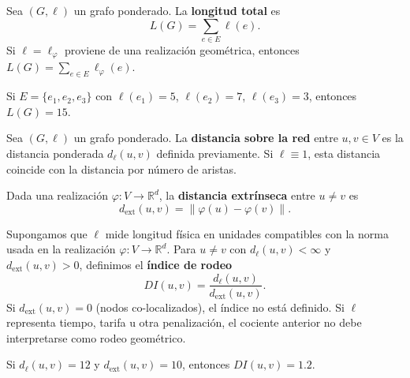         \begin{definicion}
            Sea $(G,\ell)$ un grafo ponderado. La \textbf{longitud total} es
            \[
            L(G)=\sum_{e\in E}\ell(e).
            \]
            Si $\ell=\ell_\varphi$ proviene de una realización geométrica, entonces $L(G)=\sum_{e\in E}\ell_\varphi(e)$.
        \end{definicion}

        \begin{ejemplo}
            Si $E=\{e_1,e_2,e_3\}$ con $\ell(e_1)=5$, $\ell(e_2)=7$, $\ell(e_3)=3$, entonces $L(G)=15$.
        \end{ejemplo}

        \begin{observacion}
            Sea $(G,\ell)$ un grafo ponderado. La \textbf{distancia sobre la red} entre $u,v\in V$ es la distancia ponderada $d_\ell(u,v)$ definida previamente. Si $\ell\equiv 1$, esta distancia coincide con la distancia por número de aristas.
        \end{observacion}

        \begin{definicion}
            Dada una realización $\varphi:V\to\mathbb{R}^d$, la \textbf{distancia extrínseca} entre $u\ne v$ es
            \[
            d_{\mathrm{ext}}(u,v)=\|\varphi(u)-\varphi(v)\|.
            \]
        \end{definicion}

        \begin{definicion}
            Supongamos que $\ell$ mide longitud física en unidades compatibles con la norma usada en la realización $\varphi:V\to\mathbb{R}^d$. Para $u\ne v$ con $d_\ell(u,v)<\infty$ y $d_{\mathrm{ext}}(u,v)>0$, definimos el \textbf{índice de rodeo}
            \[
            DI(u,v)=\frac{d_\ell(u,v)}{d_{\mathrm{ext}}(u,v)}.
            \]
            Si $d_{\mathrm{ext}}(u,v)=0$ (nodos co-localizados), el índice no está definido. Si $\ell$ representa tiempo, tarifa u otra penalización, el cociente anterior no debe interpretarse como rodeo geométrico.
        \end{definicion}

        \begin{ejemplo}
            Si $d_\ell(u,v)=12$ y $d_{\mathrm{ext}}(u,v)=10$, entonces $DI(u,v)=1.2$.
        \end{ejemplo}

